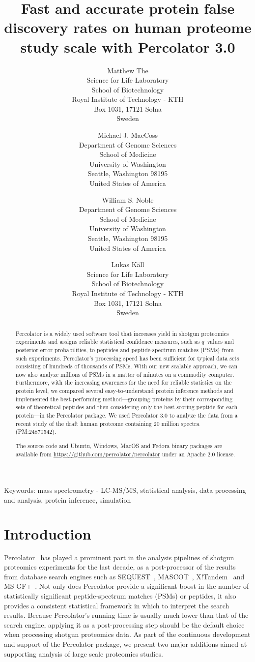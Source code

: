 \documentclass{article}
\title{Fast and accurate protein false discovery rates on human
proteome study scale with Percolator 3.0}
\author{Matthew The\\
Science for Life Laboratory\\
School of Biotechnology\\
Royal Institute of Technology - KTH\\
Box 1031, 17121 Solna\\ Sweden
\and 
Michael J. MacCoss\\
Department of Genome Sciences\\
School of Medicine\\
University of Washington\\
Seattle, Washington 98195\\
United States of America
\and 
William S. Noble\\
Department of Genome Sciences\\
School of Medicine\\
University of Washington\\
Seattle, Washington 98195\\
United States of America
\and
Lukas K\"{a}ll\\
Science for Life Laboratory\\
School of Biotechnology\\
Royal Institute of Technology - KTH\\ 
Box 1031, 17121 Solna\\ Sweden}
\begin{document}
\maketitle

\doublespacing

Keywords: mass spectrometry - LC-MS/MS, statistical analysis, 
data processing and analysis, protein inference, simulation


\newpage

\begin{abstract} 

Percolator is a widely used software tool that increases yield in
shotgun proteomics experiments and assigns reliable statistical
confidence measures, such as $q$~values and posterior error
probabilities, to peptides and peptide-spectrum matches (PSMs) from
such experiments. Percolator's processing speed has been sufficient
for typical data sets consisting of hundreds of thousands of
PSMs. With our new scalable approach, we can now also analyze millions
of PSMs in a matter of minutes on a commodity computer.  Furthermore,
with the increasing awareness for the need for reliable statistics on
the protein level, we compared several easy-to-understand protein
inference methods and implemented the best-performing
method---grouping proteins by their corresponding sets of theoretical
peptides and then considering only the best scoring peptide for each
protein---in the Percolator package. We used Percolator 3.0 to analyze
the data from a recent study of the draft human proteome containing 20
million spectra (PM:24870542).

The source code and Ubuntu, Windows, MacOS and Fedora binary packages
are available from \url{https://github.com/percolator/percolator}
under an Apache 2.0 license.
\end{abstract}

\newpage

\section*{Introduction}

Percolator~\cite{kall2007} has played a prominent part in the analysis
pipelines of shotgun proteomics experiments for the last decade, as a
post-processor of the results from database search engines such as
SEQUEST~\cite{eng1994}, MASCOT~\cite{cottrell1999},
X!Tandem~\cite{craig2004tandem} and MS-GF+~\cite{kim2008}. Not only
does Percolator provide a significant boost in the number of
statistically significant peptide-spectrum matches (PSMs) or peptides,
it also provides a consistent statistical framework in which to
interpret the search results. Because Percolator's running time is
usually much lower than that of the search engine, applying it as a
post-processing step should be the default choice when processing
shotgun proteomics data. As part of the continuous development and
support of the Percolator package, we present two major additions
aimed at supporting analysis of large scale proteomics studies.
\end{document}
